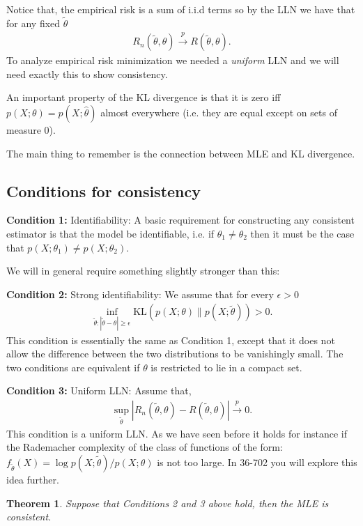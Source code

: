 \documentclass[twoside,12pt]{article}
\newcounter{lecnum}
\newtheorem{theorem}{Theorem}[lecnum]
\newcommand{\cprob}{\overset{p}{\rightarrow}}
\begin{document}
Notice that, the empirical risk is a sum of i.i.d terms so by the LLN we have that for any fixed $\widetilde{\theta}$ 
\begin{align*}
R_n(\widetilde{\theta},\theta) \cprob R(\widetilde{\theta},\theta).
\end{align*}
To analyze empirical risk minimization we needed a \emph{uniform} LLN and we will need exactly this to show consistency. 

An important property of the KL divergence is that it is zero iff $p(X;\theta) = p(X;\widehat{\theta})$ almost everywhere (i.e. they are equal except on sets of measure 0).

The main thing to remember is the connection between MLE and KL divergence.

\subsection{Conditions for consistency} 

{\bf Condition 1: } Identifiability: A basic requirement for constructing any consistent estimator is that the model be identifiable, i.e. if $\theta_1 \neq \theta_2$ then it must be the case that $p(X;\theta_1) \neq p(X;\theta_2)$.

We will in general require something slightly stronger than this:

{\bf Condition 2: } Strong identifiability: We assume that for every $\epsilon > 0$
\begin{align*}
\inf_{\widetilde{\theta}: |\widetilde{\theta} - \theta| \geq \epsilon} \text{KL}(p(X;\theta)\|p(X;\widetilde{\theta})) > 0.
\end{align*}
This condition is essentially the same as Condition 1, except that it does not allow the difference between the two distributions to be vanishingly small. The two conditions are equivalent if $\theta$ is restricted to lie in a compact set.

{\bf Condition 3: } Uniform LLN: Assume that,
\begin{align*}
\sup_{\widetilde{\theta}} |R_n(\widetilde{\theta},\theta) - R(\widetilde{\theta},\theta)| \cprob 0.
\end{align*}
This condition is a uniform LLN. As we have seen before it holds for instance if the Rademacher complexity of the class of functions of the form: $f_{\widetilde{\theta}}(X) = \log p(X; \widetilde{\theta})/p(X;\theta)$ is not too large. In 36-702 you will explore this idea further.


\begin{theorem}
Suppose that Conditions 2 and 3 above hold, then the MLE is consistent.
\end{theorem}
\end{document}

